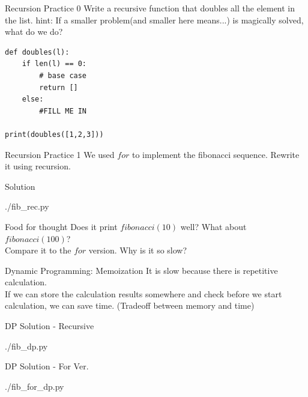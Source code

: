 \documentclass{beamer}
\begin{document}
\begin{frame}[fragile]{Recursion Practice 0}
  Write a recursive function that doubles all the element in the list.
hint: If a smaller problem(and smaller here means...) is magically solved, what do we do?
  \begin{lstlisting}
def doubles(l):
    if len(l) == 0:
        # base case
        return []
    else:
        #FILL ME IN

print(doubles([1,2,3]))
  \end{lstlisting}
\end{frame}

\begin{frame}{Recursion Practice 1}
  We used $for$ to implement the fibonacci sequence.
  Rewrite it using recursion.\footnotemark[1]

\end{frame}

\begin{frame}{Solution}
  \begin{lstinputlisting}
    {./fib_rec.py}
  \end{lstinputlisting}
\end{frame}

\begin{frame}{Food for thought}
  Does it print $fibonacci(10)$ well? What about $fibonacci(100)$?\\
  Compare it to the $for$ version. Why is it so slow?
\end{frame}

\begin{frame}{Dynamic Programming: Memoization}
  It is slow because there is repetitive calculation.\\
  If we can store the calculation results somewhere and check before we start
  calculation, we can save time. (Tradeoff between memory and time)
\end{frame}

\begin{frame}{DP Solution - Recursive}
  \begin{lstinputlisting}
    {./fib_dp.py}
  \end{lstinputlisting}
\end{frame}

\begin{frame}{DP Solution - For Ver.}
  \begin{lstinputlisting}
    {./fib_for_dp.py}
  \end{lstinputlisting}
\end{frame}
\end{document}
